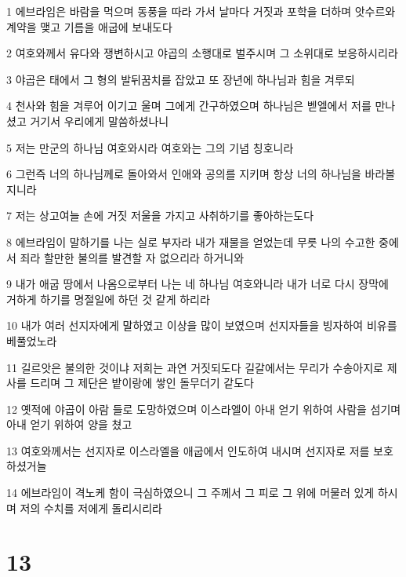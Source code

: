 \par 1 에브라임은 바람을 먹으며 동풍을 따라 가서 날마다 거짓과 포학을 더하며 앗수르와 계약을 맺고 기름을 애굽에 보내도다
\par 2 여호와께서 유다와 쟁변하시고 야곱의 소행대로 벌주시며 그 소위대로 보응하시리라
\par 3 야곱은 태에서 그 형의 발뒤꿈치를 잡았고 또 장년에 하나님과 힘을 겨루되
\par 4 천사와 힘을 겨루어 이기고 울며 그에게 간구하였으며 하나님은 벧엘에서 저를 만나셨고 거기서 우리에게 말씀하셨나니
\par 5 저는 만군의 하나님 여호와시라 여호와는 그의 기념 칭호니라
\par 6 그런즉 너의 하나님께로 돌아와서 인애와 공의를 지키며 항상 너의 하나님을 바라볼지니라
\par 7 저는 상고여늘 손에 거짓 저울을 가지고 사취하기를 좋아하는도다
\par 8 에브라임이 말하기를 나는 실로 부자라 내가 재물을 얻었는데 무릇 나의 수고한 중에서 죄라 할만한 불의를 발견할 자 없으리라 하거니와
\par 9 내가 애굽 땅에서 나옴으로부터 나는 네 하나님 여호와니라 내가 너로 다시 장막에 거하게 하기를 명절일에 하던 것 같게 하리라
\par 10 내가 여러 선지자에게 말하였고 이상을 많이 보였으며 선지자들을 빙자하여 비유를 베풀었노라
\par 11 길르앗은 불의한 것이냐 저희는 과연 거짓되도다 길갈에서는 무리가 수송아지로 제사를 드리며 그 제단은 밭이랑에 쌓인 돌무더기 같도다
\par 12 옛적에 야곱이 아람 들로 도망하였으며 이스라엘이 아내 얻기 위하여 사람을 섬기며 아내 얻기 위하여 양을 쳤고
\par 13 여호와께서는 선지자로 이스라엘을 애굽에서 인도하여 내시며 선지자로 저를 보호하셨거늘
\par 14 에브라임이 격노케 함이 극심하였으니 그 주께서 그 피로 그 위에 머물러 있게 하시며 저의 수치를 저에게 돌리시리라

\chapter{13}

